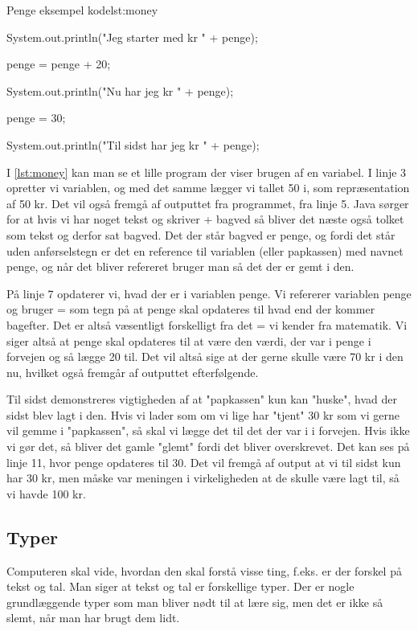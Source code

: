 {\begin{JavaCode}{Penge eksempel kode}{lst:money}
{{		System.out.println("Jeg starter med kr " + penge);
		
		penge = penge + 20;
		
		System.out.println("Nu har jeg kr " + penge);
		
		penge = 30;
		
		System.out.println("Til sidst har jeg kr " + penge);
	}
}
\end{JavaCode}

I \autoref{lst:money} kan man se et lille program der viser brugen af en variabel. I linje 3 opretter vi variablen, og med det samme lægger vi tallet 50 i, som repræsentation af 50 kr. Det vil også fremgå af outputtet fra programmet, fra linje 5. Java sørger for at hvis vi har noget tekst og skriver + bagved så bliver det næste også tolket som tekst og derfor sat bagved. Det der står bagved er penge, og fordi det står uden anførselstegn er det en reference til variablen (eller papkassen) med navnet penge, og når det bliver refereret bruger man så det der er gemt i den.

På linje 7 opdaterer vi, hvad der er i variablen penge. Vi refererer variablen penge og bruger = som tegn på at penge skal opdateres til hvad end der kommer bagefter. Det er altså væsentligt forskelligt fra det = vi kender fra matematik. Vi siger altså at penge skal opdateres til at være den værdi, der var i penge i forvejen og så lægge 20 til. Det vil altså sige at der gerne skulle være 70 kr i den nu, hvilket også fremgår af outputtet efterfølgende.

Til sidst demonstreres vigtigheden af at "papkassen" kun kan "huske", hvad der sidst blev lagt i den. Hvis vi lader som om vi lige har "tjent" 30 kr som vi gerne vil gemme i "papkassen", så skal vi lægge det til det der var i i forvejen. Hvis ikke vi gør det, så bliver det gamle "glemt" fordi det bliver overskrevet. Det kan ses på linje 11, hvor penge opdateres til 30. Det vil fremgå af output at vi til sidst kun har 30 kr, men måske var meningen i virkeligheden at de skulle være lagt til, så vi havde 100 kr.

\subsection{Typer}
Computeren skal vide, hvordan den skal forstå visse ting, f.eks. er der forskel på tekst og tal. Man siger at tekst og tal er forskellige typer. Der er nogle grundlæggende typer som man bliver nødt til at lære sig, men det er ikke så slemt, når man har brugt dem lidt.

}
